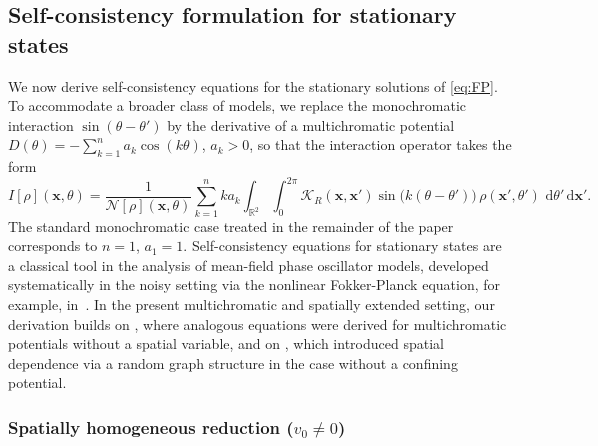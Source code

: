 \documentclass[a4paper,11pt]{article}
\theoremstyle{plain}
\theoremstyle{definition}
\theoremstyle{remark}
\newcommand{\R}{\mathbb{R}}
\newcommand{\dd}{\,\mathrm{d}}
\newcommand{\bx}{\mathbf{x}}
\newcommand{\cKr}{\mathcal{K}_R}
\begin{document}
\subsection{Self-consistency formulation for stationary states}\label{subsec:self-consistency}

We now derive self-consistency equations for the stationary solutions of \eqref{eq:FP}. To accommodate a broader class of models, we replace the monochromatic interaction $\sin(\theta - \theta')$ by the derivative of a multichromatic potential $D(\theta) = -\sum_{k=1}^n a_k \cos(k\theta)$, $a_k > 0$, so that the interaction operator takes the form
\begin{equation}\label{eq:multichromatic-I}
I[\rho](\bx,\theta)
=
\frac{1}{\mathcal{N}[\rho](\bx,\theta)}
\sum_{k=1}^n k a_k
\int_{\R^2}\int_0^{2\pi}
\cKr (\bx,\bx')\sin\big(k(\theta-\theta')\big)\,
\rho(\bx',\theta')\,\dd\theta'\dd\bx'.
\end{equation}
The standard monochromatic case treated in the remainder of the paper corresponds to $n=1$, $a_1 = 1$. Self-consistency equations for stationary states are a classical tool in the analysis of mean-field phase oscillator models, developed systematically in the noisy setting via the nonlinear Fokker-Planck equation, for example, in~\cite{bertini2010dynamical}. In the present multichromatic and spatially extended setting, our derivation builds on \cite{bertoli2024stability}, where analogous equations were derived for multichromatic potentials without a spatial variable, and on \cite{bertoli2025phase}, which introduced spatial dependence via a random graph structure in the case without a confining potential.

\subsubsection{Spatially homogeneous reduction ($v_0 \neq 0$)}\label{subsubsec:homog-reduction}
\end{document}
